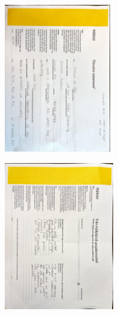 \documentclass{article}
\begin{document}
\begin{figure}[htp]
    \centering
    \includegraphics[width = 175px,angle=90]{Elev.jpg}
    \label{fig:24}
\end{figure}

\begin{figure}[htp]
    \centering
    \includegraphics[width = 180px,angle=90]{MP.jpg}
    \label{fig:24}
\end{figure}






\end{document}
